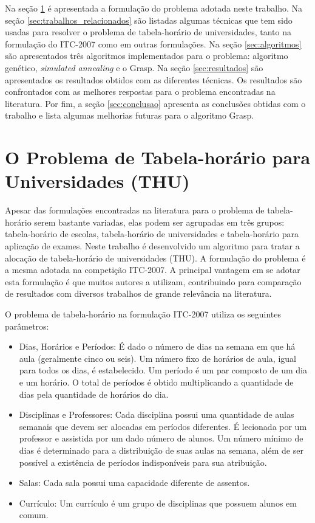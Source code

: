 \documentclass[11pt]{article}
\begin{document}
Na seção \ref{sec:problema} é apresentada a formulação do problema adotada neste trabalho. Na seção \ref{sec:trabalhos_relacionados} são listadas algumas técnicas que tem sido usadas para resolver o problema de tabela-horário de universidades, tanto na formulação do ITC-2007 como em outras formulações. Na seção \ref{sec:algoritmos} são apresentados três algoritmos implementados para o problema: algoritmo genético, \textit{simulated annealing} e o Grasp. Na seção \ref{sec:resultados} são apresentados os resultados obtidos com as diferentes técnicas. Os resultados são confrontados com as melhores respostas para o problema encontradas na literatura. Por fim, a seção \ref{sec:conclusao} apresenta as conclusões obtidas com o trabalho e lista algumas melhorias futuras para o algoritmo Grasp.

\section{O Problema de Tabela-horário para Universidades (THU)}
\label{sec:problema}

Apesar das formulações encontradas na literatura para o problema de tabela-horário serem bastante variadas, elas podem ser agrupadas em três grupos: tabela-horário de escolas, tabela-horário de universidades e tabela-horário para aplicação de exames. Neste trabalho é desenvolvido um algoritmo para tratar a alocação de tabela-horário de universidades (THU). A formulação do problema é a mesma adotada na competição ITC-2007. A principal vantagem em se adotar esta formulação é que muitos autores a utilizam, contribuindo para comparação de resultados com diversos trabalhos de grande relevância na literatura.

O problema de tabela-horário na formulação ITC-2007 utiliza os seguintes parâmetros:

\begin{itemize}

\item Dias, Horários e Períodos: É dado o número de dias na semana em que há aula (geralmente cinco ou seis). Um número fixo de horários de aula, igual para todos os dias, é estabelecido. Um período é um par composto de um dia e um horário. O total de períodos é obtido multiplicando a quantidade de dias pela quantidade de horários do dia.

\item Disciplinas e Professores: Cada disciplina possui uma quantidade de aulas semanais que devem ser alocadas em períodos diferentes. É lecionada por um professor e assistida por um dado número de alunos. Um número mínimo de dias é determinado para a distribuição de suas aulas na semana, além de ser possível a existência de períodos indisponíveis para sua atribuição.

\item Salas: Cada sala possui uma capacidade diferente de assentos.

\item Currículo: Um currículo é um grupo de disciplinas que possuem alunos em comum.

\end{itemize}
\end{document}
